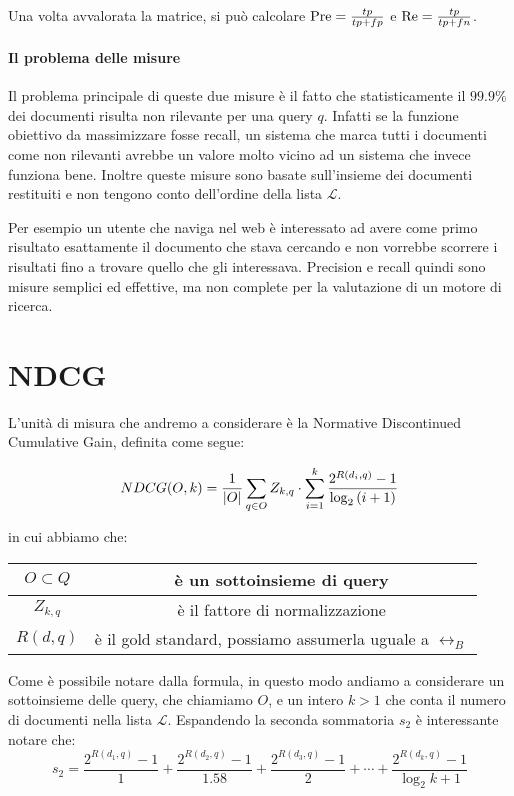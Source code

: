 Una volta avvalorata la matrice, si può calcolare $\text{Pre} = \frac{tp}{tp + fp}$ e $\text{Re} = \frac{tp}{tp + fn}$.

\paragraph{Il problema delle misure}
Il problema principale di queste due misure è il fatto che statisticamente il $99.9\%$\cite{irbook} dei documenti
risulta non rilevante per una query $q$. 
Infatti se la funzione obiettivo da massimizzare fosse recall,
un sistema che marca tutti i documenti come non rilevanti avrebbe
un valore molto vicino ad un sistema che invece funziona bene. Inoltre
queste misure sono basate sull'insieme dei documenti restituiti e non tengono
conto dell'ordine della lista $\mathcal{L}$.

Per esempio un utente che naviga nel web è interessato
ad avere come primo risultato esattamente il documento che stava cercando
e non vorrebbe scorrere i risultati fino a trovare quello che gli interessava.
Precision e recall quindi sono misure semplici ed effettive, ma non
complete per la valutazione di un motore di ricerca.

\section{NDCG}
L'unità di misura che andremo a considerare è la Normative Discontinued Cumulative Gain,
definita come segue:

$$\label{def:ndcg}
NDCG(O, k) = \frac{1}{\left|O\right|} \sum_{q \in O} Z_{k, q} \cdot \sum_{i=1}^{k} \frac{2^{R(d_i, q)} - 1}{\log_2{(i + 1)}} \\
$$

in cui abbiamo che:
\begin{table}[h!]
	\centering
	\begin{tabular}{|c|c|}
		\hline
		$ O \subset Q$ & è un sottoinsieme di query \\
		\hline
		$Z_{k,q}$ & è il fattore di normalizzazione \\
		\hline
		$R(d,q)$ & è il gold standard, possiamo assumerla uguale a $\rel_B$ \\
		\hline
	\end{tabular}
\end{table}


Come è possibile notare dalla formula, in questo modo andiamo a considerare un sottoinsieme delle query, che chiamiamo $O$,
e un intero $k>1$ che conta il numero di documenti nella lista $\mathcal{L}$.
Espandendo la seconda sommatoria $s_2$ è interessante notare che:
$$
s_2 = \frac{2^{R(d_1, q) } - 1}{1} + \frac{2^{R(d_2, q)} - 1}{1.58} + \frac{2^{R(d_3, q)} - 1}{2} + \dotsb + \frac{2^{R(d_k, q) } - 1}{\log_2{k + 1}}
$$

